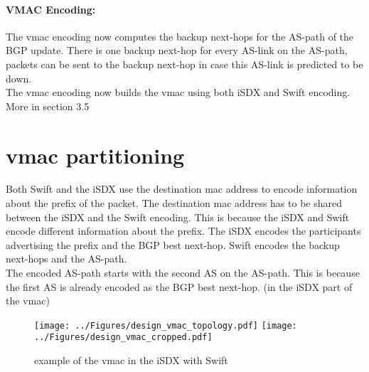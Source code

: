 \paragraph{\label{chapter3:Changes to the iSDX:Vmac Encoding}VMAC Encoding:}
The vmac encoding now computes the backup next-hops for the AS-path of the BGP update. There is one backup next-hop for every AS-link on the AS-path, packets can be sent to the backup next-hop in case this AS-link is predicted to be down. \\
The vmac encoding now builds the vmac using both iSDX and Swift encoding. \\
More in section 3.5 

\section{\label{chapter3:vmac partitioning}vmac partitioning}

Both Swift and the iSDX use the destination mac address to encode information about the prefix of the packet. The destination mac address has to be shared between the iSDX and the Swift encoding. This is because the iSDX and Swift encode different information about the prefix. The iSDX encodes the participants advertising the prefix and the BGP best next-hop. Swift encodes the backup next-hops and the AS-path. \\
The encoded AS-path starts with the second AS on the AS-path. This is because the first AS is already encoded as the BGP best next-hop. (in the iSDX part of the vmac)
\begin{figure}[h]
\center
\texttt{[image: ../Figures/design\_vmac\_topology.pdf]}
\texttt{[image: ../Figures/design\_vmac\_cropped.pdf]}
\caption{example of the vmac in the iSDX with Swift}
\end{figure}

\newpage
